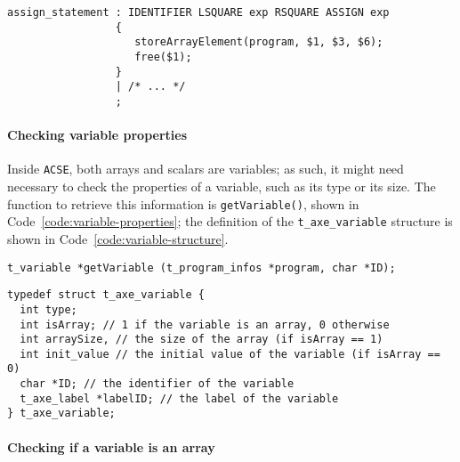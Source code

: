 \begin{onepage}
  \begin{lstlisting}[language=LANCE, caption={Array assignment grammar}, label={code:array-assignment-grammar}]
assign_statement : IDENTIFIER LSQUARE exp RSQUARE ASSIGN exp
                 {
                    storeArrayElement(program, $1, $3, $6);
                    free($1);
                 }
                 | /* ... */
                 ;
\end{lstlisting}
\end{onepage}

\paragraph{Checking variable properties}

Inside \texttt{ACSE}, both arrays and scalars are variables;
as such, it might need necessary to check the properties of a variable, such as its type or its size.
The function to retrieve this information is \texttt{getVariable()}, shown in Code~\ref{code:variable-properties};
the definition of the \texttt{t\_axe\_variable} structure is shown in Code~\ref{code:variable-structure}.

\begin{onepage}
  \begin{lstlisting}[language=LANCE, caption={Variable properties}, label={code:variable-properties}]
t_variable *getVariable (t_program_infos *program, char *ID);
\end{lstlisting}
\end{onepage}

\begin{onepage}
  \begin{lstlisting}[language=LANCE, caption={Variable structure}, label={code:variable-structure}]
typedef struct t_axe_variable {
  int type;
  int isArray; // 1 if the variable is an array, 0 otherwise
  int arraySize, // the size of the array (if isArray == 1)
  int init_value // the initial value of the variable (if isArray == 0)
  char *ID; // the identifier of the variable
  t_axe_label *labelID; // the label of the variable
} t_axe_variable;
\end{lstlisting}
\end{onepage}

\paragraph{Checking if a variable is an array}

